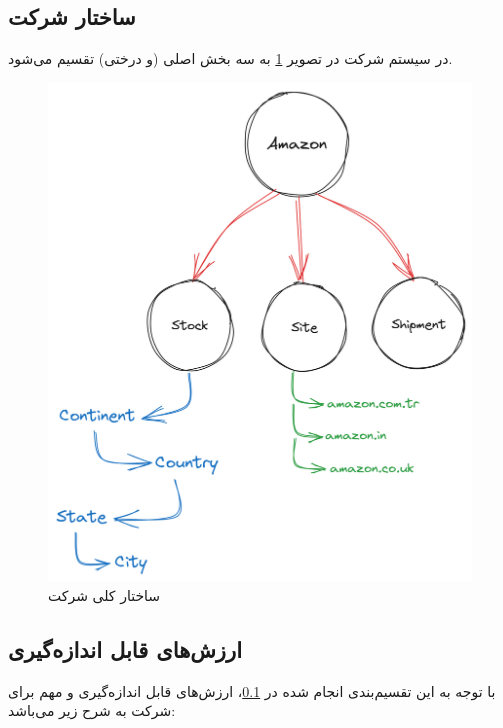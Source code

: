 \documentclass[12pt]{article}
\begin{document}
\subsection{ساختار شرکت}\label{amz-struct}
در سیستم  شرکت  در تصویر \ref{amz-s3} به سه بخش اصلی (و درختی) تقسیم می‌شود.
\begin{figure}[b]
\begin{center}
    \includegraphics[width=\textwidth, height=\textheight]{../images/amazon-s3-comp(2)}
\end{center} 
\caption{ساختار کلی شرکت }\label{amz-s3}
\end{figure}

\subsection{ارزش‌های قابل‌ اندازه‌گیری}\label{intro-movs}
با توجه به این تقسیم‌بندی انجام شده در \ref{amz-struct}، ارزش‌های قابل‌ اندازه‌گیری \label{movs}
و مهم برای شرکت  به شرح زیر می‌باشد:
\end{document}
